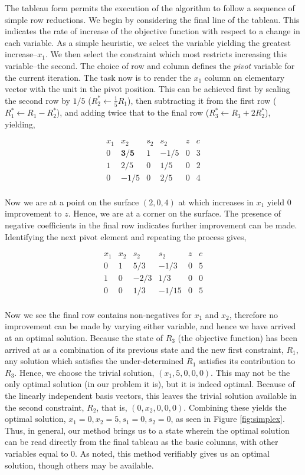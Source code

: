 \documentclass[11pt]{amsart}
\begin{document}
The tableau form permits the execution of the algorithm to follow a sequence of simple row reductions. We begin by considering the final line of the tableau. This indicates the rate of increase of the objective function with respect to a change in each variable. As a simple heuristic, we select the variable yielding the greatest increase--$x_1$. We then select the constraint which most restricts increasing this variable--the second. The choice of row and column defines the \emph{pivot} variable for the current iteration. The task now is to render the $x_1$ column an elementary vector with the unit in the pivot position. This can be achieved first by scaling the second row by $1/5$ ($R_2^* \leftarrow \frac{1}{5}R_1 $), then subtracting it from the first row ($R_1^* \leftarrow R_1 - R_2^*$), and adding twice that to the final row ($R_3^* \leftarrow R_3 + 2R_2^*$), yielding,

$$
\begin{array}{rrrrr|r}
x_1&x_2&s_2&s_2&z&c \\
\hline
0&\mathbf{3/5}&1&-1/5&0&3 \\
1&2/5&0&1/5&0&2 \\
\hline
0&-1/5&0&2/5&0&4 \\
\end{array}
$$

Now we are at a point on the surface $(2, 0, 4)$ at which increases in $x_1$ yield $0$ improvement to $z$. Hence, we are at a corner on the surface. The presence of negative coefficients in the final row indicates further improvement can be made. Identifying the next pivot element and repeating the process gives,

$$
\begin{array}{rrrrr|r}
x_1&x_2&s_2&s_2&z&c \\
\hline
0&1&5/3&-1/3&0&5\\
1&0&-2/3&1/3&0&0\\
\hline
0&0&1/3&-1/15&0&5\\
\end{array}
$$

Now we see the final row contains non-negatives for $x_1$ and $x_2$, therefore no improvement can be made by varying either variable, and hence we have arrived at an optimal solution. Because the state of $R_3$ (the objective function) has been arrived at as a combination of its previous state and the new first constraint, $R_1$, any solution which satisfies the under-determined $R_1$ satisfies its contribution to $R_3$. Hence, we choose the trivial solution, $(x_1, 5, 0, 0, 0)$. This may not be the only optimal solution (in our problem it is), but it is indeed optimal. Because of the linearly independent basis vectors, this leaves the trivial solution available in the second constraint, $R_2$, that is, $(0, x_2, 0, 0, 0)$. Combining these yields the optimal solution, $x_1 = 0, x_2 = 5, s_1 = 0, s_2 = 0$, as seen in Figure \ref{fig:simplex}. Thus, in general, our method brings us to a state wherein the optimal solution can be read directly from the final tableau as the basic columns, with other variables equal to 0. As noted, this method verifiably gives us an optimal solution, though others may be available.
\end{document}
